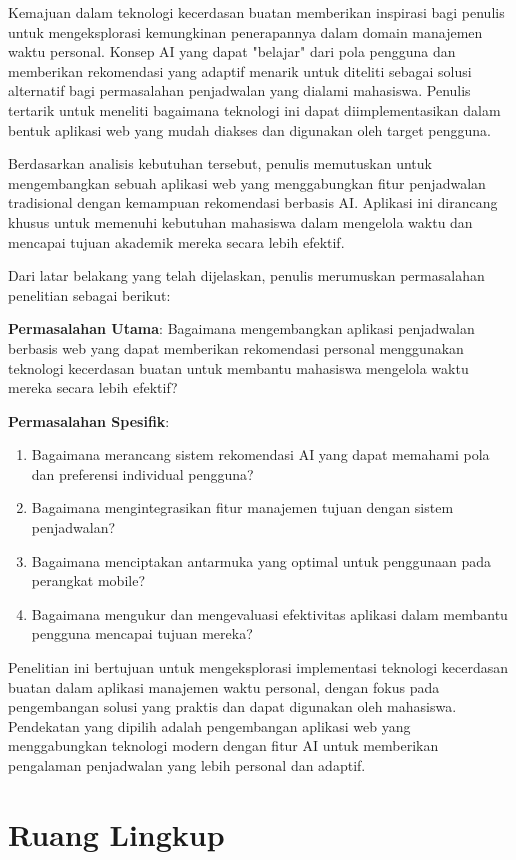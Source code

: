 Kemajuan dalam teknologi kecerdasan buatan memberikan inspirasi bagi penulis untuk mengeksplorasi kemungkinan penerapannya dalam domain manajemen waktu personal. Konsep AI yang dapat "belajar" dari pola pengguna dan memberikan rekomendasi yang adaptif menarik untuk diteliti sebagai solusi alternatif bagi permasalahan penjadwalan yang dialami mahasiswa. Penulis tertarik untuk meneliti bagaimana teknologi ini dapat diimplementasikan dalam bentuk aplikasi web yang mudah diakses dan digunakan oleh target pengguna.

Berdasarkan analisis kebutuhan tersebut, penulis memutuskan untuk mengembangkan sebuah aplikasi web yang menggabungkan fitur penjadwalan tradisional dengan kemampuan rekomendasi berbasis AI. Aplikasi ini dirancang khusus untuk memenuhi kebutuhan mahasiswa dalam mengelola waktu dan mencapai tujuan akademik mereka secara lebih efektif.

Dari latar belakang yang telah dijelaskan, penulis merumuskan permasalahan penelitian sebagai berikut:

\noindent \textbf{Permasalahan Utama}: Bagaimana mengembangkan aplikasi penjadwalan berbasis web yang dapat memberikan rekomendasi personal menggunakan teknologi kecerdasan buatan untuk membantu mahasiswa mengelola waktu mereka secara lebih efektif?

\noindent \textbf{Permasalahan Spesifik}:
\begin{enumerate}
\item Bagaimana merancang sistem rekomendasi AI yang dapat memahami pola dan preferensi individual pengguna?
\item Bagaimana mengintegrasikan fitur manajemen tujuan dengan sistem penjadwalan?
\item Bagaimana menciptakan antarmuka yang optimal untuk penggunaan pada perangkat mobile?
\item Bagaimana mengukur dan mengevaluasi efektivitas aplikasi dalam membantu pengguna mencapai tujuan mereka?
\end{enumerate}

Penelitian ini bertujuan untuk mengeksplorasi implementasi teknologi kecerdasan buatan dalam aplikasi manajemen waktu personal, dengan fokus pada pengembangan solusi yang praktis dan dapat digunakan oleh mahasiswa. Pendekatan yang dipilih adalah pengembangan aplikasi web yang menggabungkan teknologi modern dengan fitur AI untuk memberikan pengalaman penjadwalan yang lebih personal dan adaptif.

\section{Ruang Lingkup}

